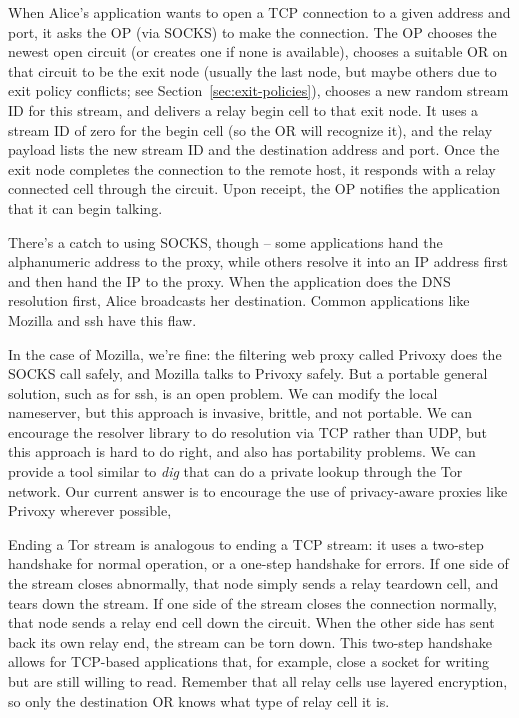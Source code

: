 \documentclass[times,10pt,twocolumn]{article}
\begin{document}
\label{subsec:tcp}

When Alice's application wants to open a TCP connection to a given
address and port, it asks the OP (via SOCKS) to make the connection. The
OP chooses the newest open circuit (or creates one if none is available),
chooses a suitable OR on that circuit to be the exit node (usually the
last node, but maybe others due to exit policy conflicts; see
Section~\ref{sec:exit-policies}), chooses a new random stream ID for
this stream,
and delivers a relay begin cell to that exit node. It uses a stream ID
of zero for the begin cell (so the OR will recognize it), and the relay
payload lists the new stream ID and the destination address and port.
Once the exit node completes the connection to the remote host, it
responds with a relay connected cell through the circuit. Upon receipt,
the OP notifies the application that it can begin talking.

There's a catch to using SOCKS, though -- some applications hand the
alphanumeric address to the proxy, while others resolve it into an IP
address first and then hand the IP to the proxy. When the application
does the DNS resolution first, Alice broadcasts her destination. Common
applications like Mozilla and ssh have this flaw.

In the case of Mozilla, we're fine: the filtering web proxy called Privoxy
does the SOCKS call safely, and Mozilla talks to Privoxy safely. But a
portable general solution, such as for ssh, is an open problem. We can
modify the local nameserver, but this approach is invasive, brittle, and
not portable. We can encourage the resolver library to do resolution
via TCP rather than UDP, but this approach is hard to do right, and also
has portability problems. We can provide a tool similar to \emph{dig} that
can do a private lookup through the Tor network. Our current answer is to
encourage the use of privacy-aware proxies like Privoxy wherever possible,

Ending a Tor stream is analogous to ending a TCP stream: it uses a
two-step handshake for normal operation, or a one-step handshake for
errors. If one side of the stream closes abnormally, that node simply
sends a relay teardown cell, and tears down the stream. If one side
of the stream closes the connection normally, that node sends a relay
end cell down the circuit. When the other side has sent back its own
relay end, the stream can be torn down. This two-step handshake allows
for TCP-based applications that, for example, close a socket for writing
but are still willing to read. Remember that all relay cells use layered
encryption, so only the destination OR knows what type of relay cell
it is.
\end{document}
